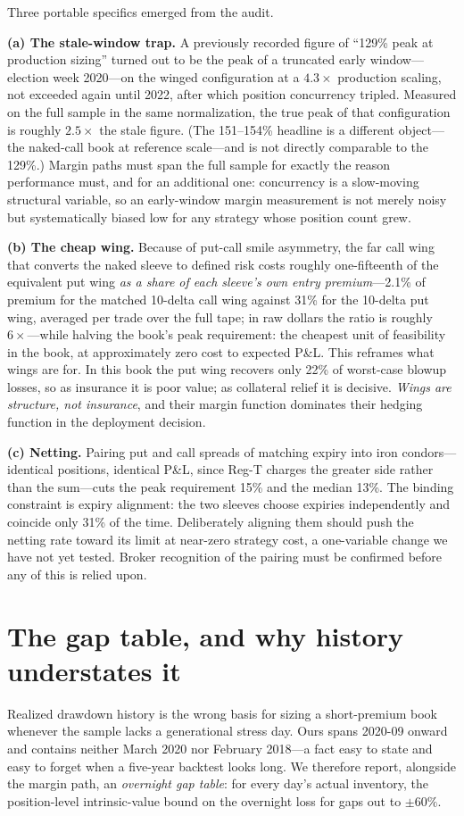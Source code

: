 \documentclass[11pt]{article}
\begin{document}
Three portable specifics emerged from the audit.

\textbf{(a) The stale-window trap.} A previously recorded figure of ``129\% peak at production
sizing'' turned out to be the peak of a truncated early window---election week 2020---on the
winged configuration at a $4.3\times$ production scaling, not
exceeded again until 2022, after which position concurrency tripled. Measured on the full
sample in the same normalization, the true peak of that configuration is roughly $2.5\times$
the stale figure. (The 151--154\% headline is a different object---the naked-call book at
reference scale---and is not directly comparable to the 129\%.) Margin paths must span the full sample for exactly
the reason performance must, and for an additional one: concurrency is a slow-moving structural
variable, so an early-window margin measurement is not merely noisy but systematically biased
low for any strategy whose position count grew.

\textbf{(b) The cheap wing.} Because of put-call smile asymmetry, the far call wing that
converts the naked sleeve to defined risk costs roughly one-fifteenth of the equivalent put
wing \emph{as a share of each sleeve's own entry premium}---2.1\% of premium for the matched
10-delta call wing against 31\% for the 10-delta put wing, averaged per trade over the full
tape; in raw dollars the ratio is roughly $6\times$---while halving the book's peak
requirement: the cheapest unit of feasibility in the book,
at approximately zero cost to expected P\&L. This reframes what wings are for. In this book the
put wing recovers only 22\% of worst-case blowup losses, so as insurance it is poor value; as
collateral relief it is decisive. \emph{Wings are structure, not insurance}, and their margin
function dominates their hedging function in the deployment decision.

\textbf{(c) Netting.} Pairing put and call spreads of matching expiry into iron condors---
identical positions, identical P\&L, since Reg-T charges the greater side rather than the
sum---cuts the peak requirement 15\% and the median 13\%. The binding constraint is expiry
alignment: the two sleeves choose expiries independently and coincide only 31\% of the time.
Deliberately aligning them should push the netting rate toward its limit at near-zero strategy
cost, a one-variable change we have not yet tested. Broker recognition of the pairing must be
confirmed before any of this is relied upon.

\section{The gap table, and why history understates it}\label{sec:gap}
Realized drawdown history is the wrong basis for sizing a short-premium book whenever the
sample lacks a generational stress day. Ours spans 2020-09 onward and contains neither March
2020 nor February 2018---a fact easy to state and easy to forget when a five-year backtest
looks long. We therefore report, alongside the margin path, an \emph{overnight gap table}: for
every day's actual inventory, the position-level intrinsic-value bound on the overnight loss
for gaps out to $\pm 60\%$.
\end{document}
